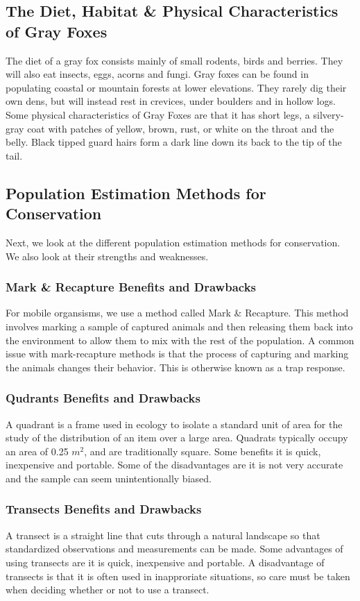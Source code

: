 \documentclass[a4paper]{article}
\begin{document}
\subsection{The Diet, Habitat \& Physical Characteristics of Gray Foxes}
The diet of a gray fox consists mainly of small rodents, birds and berries. They will also eat insects, eggs, acorns and fungi. Gray foxes can be found in
populating coastal or mountain forests at lower elevations. They rarely dig their own dens, but will instead rest in crevices, under boulders and in hollow
logs. Some physical characteristics of Gray Foxes are that it has short legs, a silvery-gray coat with patches of yellow, brown, rust, or white on the 
throat and the belly. Black tipped guard hairs form a dark line down its back to the tip of the tail.

\newpage

\subsection{Population Estimation Methods for Conservation}
Next, we look at the different population estimation methods for conservation. We also look at their strengths and weaknesses. 

\subsubsection{Mark \& Recapture Benefits and Drawbacks}
For mobile organsisms, we use a method called Mark \& Recapture. This method involves marking a sample of captured animals and then releasing them back into 
the environment to allow them to mix with the rest of the population. A common issue with mark-recapture methods is that the process of capturing and marking
the animals changes their behavior. This is otherwise known as a trap response.

\subsubsection{Qudrants Benefits and Drawbacks}
A quadrant is a frame used in ecology to isolate a standard unit of area for the study of the distribution of an item over a large area. Quadrats typically 
occupy an area of 0.25 $m^2$, and are traditionally square. Some benefits it is quick, inexpensive and portable. Some of the disadvantages are it is not 
very accurate and the sample can seem unintentionally biased.

\subsubsection{Transects Benefits and Drawbacks}
A transect is a straight line that cuts through a natural landscape so that standardized observations and measurements can be made. Some advantages of using
transects are it is quick, inexpensive and portable. A disadvantage of transects is that it is often used in inapproriate situations, so care must be taken 
when deciding whether or not to use a transect.
\end{document}
